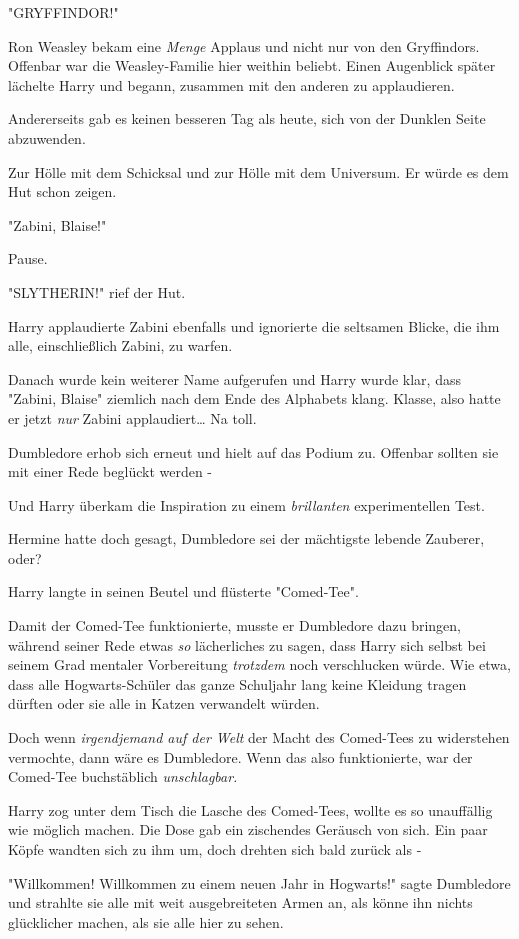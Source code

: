 {"GRYFFINDOR!"

Ron Weasley bekam eine \emph{Menge} Applaus und nicht nur von den Gryffindors. Offenbar war die Weasley-Familie hier weithin beliebt. Einen Augenblick später lächelte Harry und begann, zusammen mit den anderen zu applaudieren.

Andererseits gab es keinen besseren Tag als heute, sich von der Dunklen Seite abzuwenden.

Zur Hölle mit dem Schicksal und zur Hölle mit dem Universum. Er würde es dem Hut schon zeigen.

"Zabini, Blaise!"

Pause.

"SLYTHERIN!" rief der Hut.

Harry applaudierte Zabini ebenfalls und ignorierte die seltsamen Blicke, die ihm alle, einschließlich Zabini, zu warfen.

Danach wurde kein weiterer Name aufgerufen und Harry wurde klar, dass "Zabini, Blaise" ziemlich nach dem Ende des Alphabets klang. Klasse, also hatte er jetzt \emph{nur} Zabini applaudiert… Na toll.

Dumbledore erhob sich erneut und hielt auf das Podium zu. Offenbar sollten sie mit einer Rede beglückt werden -

Und Harry überkam die Inspiration zu einem \emph{brillanten} experimentellen Test.

Hermine hatte doch gesagt, Dumbledore sei der mächtigste lebende Zauberer, oder?

Harry langte in seinen Beutel und flüsterte "Comed-Tee".

Damit der Comed-Tee funktionierte, musste er Dumbledore dazu bringen, während seiner Rede etwas \emph{so} lächerliches zu sagen, dass Harry sich selbst bei seinem Grad mentaler Vorbereitung \emph{trotzdem} noch verschlucken würde. Wie etwa, dass alle Hogwarts-Schüler das ganze Schuljahr lang keine Kleidung tragen dürften oder sie alle in Katzen verwandelt würden.

Doch wenn \emph{irgendjemand auf der Welt} der Macht des Comed-Tees zu widerstehen vermochte, dann wäre es Dumbledore. Wenn das also funktionierte, war der Comed-Tee buchstäblich \emph{unschlagbar.}

Harry zog unter dem Tisch die Lasche des Comed-Tees, wollte es so unauffällig wie möglich machen. Die Dose gab ein zischendes Geräusch von sich. Ein paar Köpfe wandten sich zu ihm um, doch drehten sich bald zurück als -

"Willkommen! Willkommen zu einem neuen Jahr in Hogwarts!" sagte Dumbledore und strahlte sie alle mit weit ausgebreiteten Armen an, als könne ihn nichts glücklicher machen, als sie alle hier zu sehen.

}
